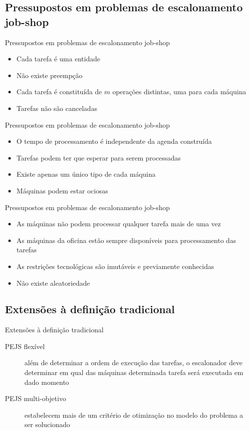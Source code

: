 \documentclass{beamer}
\begin{document}
\subsection{Pressupostos em problemas de escalonamento job-shop}
\begin{frame}{Pressupostos em problemas de escalonamento job-shop}
\begin{itemize}
\item<1-> Cada tarefa \'{e} uma entidade
\item<2-> N\~{a}o existe preemp\c{c}\~{a}o
\item<3-> Cada tarefa \'{e} constitu\'{i}da de $m$ opera\c{c}\~{o}es distintas, uma para cada m\'{a}quina
\item<4-> Tarefas n\~{a}o s\~{a}o canceladas
\end{itemize}
\end{frame}
\begin{frame}{Pressupostos em problemas de escalonamento job-shop}
\begin{itemize}
\item<1-> O tempo de processamento \'{e} independente da agenda constru\'{i}da
\item<2-> Tarefas podem ter que esperar para serem processadas
\item<3-> Existe apenas um \'{u}nico tipo de cada m\'{a}quina
\item<4-> M\'{a}quinas podem estar ociosas
\end{itemize}
\end{frame}
\begin{frame}{Pressupostos em problemas de escalonamento job-shop}
\begin{itemize}
\item<1-> As m\'{a}quinas n\~{a}o podem processar qualquer tarefa mais de uma vez
\item<2-> As m\'{a}quinas da oficina est\~{a}o sempre dispon\'{i}veis para processamento das tarefas
\item<3-> As restri\c{c}\~{o}es tecnol\'{o}gicas s\~{a}o imut\'{a}veis e previamente conhecidas
\item<4-> N\~{a}o existe aleatoriedade
\end{itemize}
\end{frame}

\subsection{Extens\~{o}es \`{a} defini\c{c}\~{a}o tradicional}
\begin{frame}{Extens\~{o}es \`{a} defini\c{c}\~{a}o tradicional}
\begin{description}
\item[PEJS flex\'{i}vel] al\'{e}m de determinar a ordem de execu\c{c}\~{a}o das tarefas, o escalonador deve
determinar em qual das m\'{a}quinas determinada tarefa ser\'{a} executada em dado momento
\item[PEJS multi-objetivo] estabelecem mais de um crit\'{e}rio de otimiza\c{c}\~{a}o no modelo do problema a ser solucionado
\end{description}
\end{frame}
\end{document}
